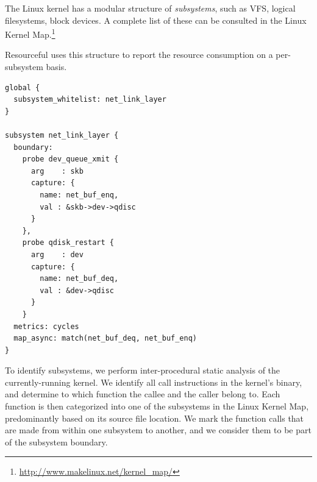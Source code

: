 \documentclass[letterpaper,twocolumn,10pt]{article}
\newcommand{\pname}{Resourceful}
\newcommand{\lnote}[1]{\textcolor{red}{[\textit{#1}]}} %
\begin{document}
The Linux kernel has a modular structure of \emph{subsystems}, such as VFS,
logical filesystems, block devices. A complete list of these can be consulted in
the Linux Kernel Map.\footnote{\url{http://www.makelinux.net/kernel_map/}}

\pname{ } uses this structure to report the resource consumption on a
per-subsystem basis. 



\vspace{1em}
\lstset{style=customc, captionpos=b}
\begin{lstlisting}[caption={Sample configuration file defining a custom subsystem},label={lst:config}]
global {
  subsystem_whitelist: net_link_layer
}

subsystem net_link_layer {
  boundary:
    probe dev_queue_xmit {
      arg    : skb
      capture: {
        name: net_buf_enq,
        val : &skb->dev->qdisc
      }
    },
    probe qdisk_restart {
      arg    : dev
      capture: {
        name: net_buf_deq,
        val : &dev->qdisc
      }
    }
  metrics: cycles
  map_async: match(net_buf_deq, net_buf_enq)
}
\end{lstlisting}

To identify subsystems, we perform inter-procedural static analysis of the
currently-running kernel. We identify all call instructions in the kernel's
binary, and determine to which function the callee and the caller belong to. Each
function is then categorized into one of the subsystems in the Linux Kernel Map,
predominantly based on its source file location. We mark the function calls that
are made from within one subsystem to another, and we consider them to be part
of the subsystem boundary. 
\end{document}

